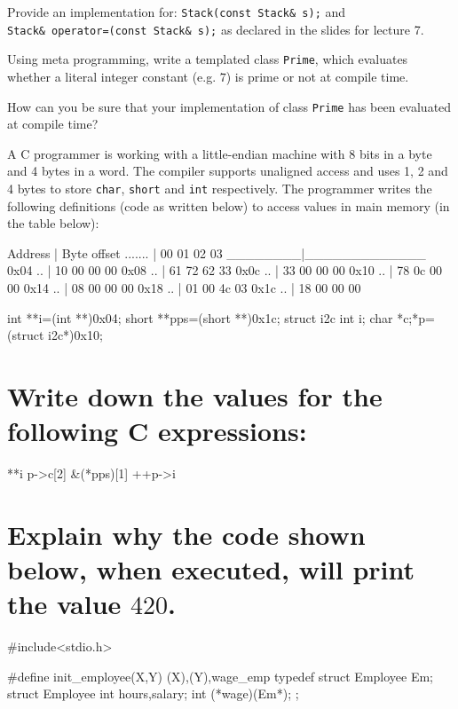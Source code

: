 \documentclass[NewMinted]{supervision}
\begin{document}
\begin{questions}
\begin{solution}
\begin{solution}
    \question
    Provide an implementation for: \lstinline|Stack(const Stack& s);| and \\ \lstinline|Stack& operator=(const Stack& s);| as declared in the slides for lecture 7.

    \question
    Using meta programming, write a templated class \lstinline|Prime|, which evaluates whether a literal integer constant (e.g. $7$) is prime or not at compile time.

    \question
    How can you be sure that your implementation of class \lstinline|Prime| has been evaluated at compile time?


    A C programmer is working with a little-endian machine with 8 bits in a byte and 4 bytes in a word. The compiler supports unaligned access and uses 1, 2 and 4 bytes to store \lstinline|char|, \lstinline|short| and \lstinline|int| respectively. The programmer writes the following definitions (code as written below) to access values in main memory (in the table below):
    \begin{cpp}
    Address | Byte offset
    ....... | 00 01 02 03
    ________|_____________
    0x04 .. | 10 00 00 00
    0x08 .. | 61 72 62 33
    0x0c .. | 33 00 00 00
    0x10 .. | 78 0c 00 00
    0x14 .. | 08 00 00 00
    0x18 .. | 01 00 4c 03
    0x1c .. | 18 00 00 00

    int **i=(int **)0x04;
    short **pps=(short **)0x1c;
    struct i2c {int i; char *c;}*p=(struct i2c*)0x10;
    \end{cpp}

    \begin{parts}
        \part[8]{Write down the values for the following C expressions:}
        \begin{cpp}
        **i
        p->c[2]
        &(*pps)[1]
        ++p->i
        \end{cpp}

        \part[4]{Explain why the code shown below, when executed, will print the value $420$.}
        \begin{cpp}
        #include<stdio.h>

        #define init_employee(X,Y) {(X),(Y),wage_emp}
        typedef struct Employee Em;
        struct Employee {
            int hours,salary;
            int (*wage)(Em*);
        };


\end{cpp}
\end{parts}
\end{solution}
\end{solution}
\end{questions}
\end{document}
